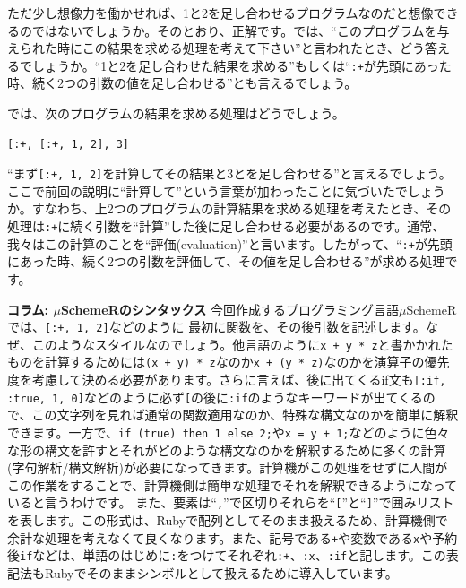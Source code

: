 ただ少し想像力を働かせれば、1と2を足し合わせるプログラムなのだと想像できるのではないでしょうか。そのとおり、正解です。では、“このプログラムを与えられた時にこの結果を求める処理を考えて下さい”と言われたとき、どう答えるでしょうか。“1と2を足し合わせた結果を求める”もしくは“{\tt :+}が先頭にあった時、続く2つの引数の値を足し合わせる”とも言えるでしょう。

では、次のプログラムの結果を求める処理はどうでしょう。

\begin{lstlisting}
[:+, [:+, 1, 2], 3]
\end{lstlisting}

“まず{\tt [:+, 1, 2]}を計算してその結果と3とを足し合わせる”と言えるでしょう。ここで前回の説明に“計算して”という言葉が加わったことに気づいたでしょうか。すなわち、上2つのプログラムの計算結果を求める処理を考えたとき、その処理は{\tt :+}に続く引数を“計算”した後に足し合わせる必要があるのです。通常、我々はこの計算のことを“評価(evaluation)”と言います。したがって、“{\tt :+}が先頭にあった時、続く2つの引数を評価して、その値を足し合わせる”が求める処理です。


\begin{breakitembox}[l]{\bf コラム: $\mu$SchemeRのシンタックス} 
今回作成するプログラミング言語$\mu$SchemeRでは、{\tt [:+, 1, 2]}などのように
最初に関数を、その後引数を記述します。なぜ、このようなスタイルなのでしょう。他言語のように{\tt x + y * z}と書かかれたものを計算するためには{\tt (x + y) * z}なのか{\tt x + (y * z)}なのかを演算子の優先度を考慮して決める必要があります。さらに言えば、後に出てくるif文も{\tt [:if, :true,  1, 0]}などのように必ず{\tt [}の後に{\tt :if}のようなキーワードが出てくるので、この文字列を見れば通常の関数適用なのか、特殊な構文なのかを簡単に解釈できます。一方で、{\tt if (true) then 1 else 2;}や{\tt x = y + 1;}などのように色々な形の構文を許すとそれがどのような構文なのかを解釈するために多くの計算(字句解析/構文解析)が必要になってきます。計算機がこの処理をせずに人間がこの作業をすることで、計算機側は簡単な処理でそれを解釈できるようになっていると言うわけです\footnotemark[2]。
また、要素は“{\tt ,}”で区切りそれらを“{\tt [}”と“{\tt ]}”で囲みリストを表します。この形式は、Rubyで配列としてそのまま扱えるため、計算機側で余計な処理を考えなくて良くなります。また、記号である{\tt +}や変数である{\tt x}や予約後{\tt if}などは、単語のはじめに{\tt :}をつけてそれぞれ{\tt :+}、{\tt :x}、{\tt :if}と記します。この表記法もRubyでそのままシンボル\footnotemark[3]として扱えるために導入しています。
\end{breakitembox}

